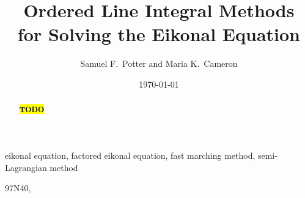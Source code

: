 \documentclass{siamart171218}
\begin{document}
\title{Ordered Line Integral Methods \\ for Solving the Eikonal Equation}
\author{Samuel F.\ Potter and Maria K.\ Cameron}
\date{\today}

\maketitle

\begin{abstract}
  \hl{\textbf{TODO}}
\end{abstract}

\begin{keywords}
  eikonal equation, factored eikonal equation, fast marching method,
  semi-Lagrangian method
\end{keywords}

\begin{AMS}
  97N40, %
\end{AMS}









\appendix








{}

\newpage

\end{document}

